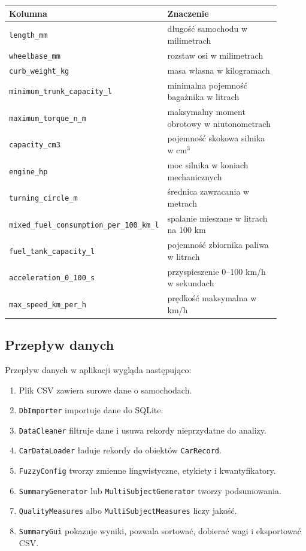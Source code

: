 \documentclass[11pt,a4paper]{article}
\newcommand{\code}[1]{\texttt{#1}}
\newcommand{\smallcode}[1]{{\scriptsize\texttt{#1}}}
\begin{document}
\begin{longtable}{p{0.35\linewidth}p{0.55\linewidth}}
\toprule
\textbf{Kolumna} & \textbf{Znaczenie}\\
\midrule
\endhead
\code{length\_mm} & długość samochodu w milimetrach\\
\code{wheelbase\_mm} & rozstaw osi w milimetrach\\
\code{curb\_weight\_kg} & masa własna w kilogramach\\
\code{minimum\_trunk\_capacity\_l} & minimalna pojemność bagażnika w litrach\\
\code{maximum\_torque\_n\_m} & maksymalny moment obrotowy w niutonometrach\\
\code{capacity\_cm3} & pojemność skokowa silnika w cm\(^3\)\\
\code{engine\_hp} & moc silnika w koniach mechanicznych\\
\code{turning\_circle\_m} & średnica zawracania w metrach\\
\smallcode{mixed\_fuel\_consumption\_per\_100\_km\_l} & spalanie mieszane w litrach na 100 km\\
\code{fuel\_tank\_capacity\_l} & pojemność zbiornika paliwa w litrach\\
\code{acceleration\_0\_100\_s} & przyspieszenie 0--100 km/h w sekundach\\
\code{max\_speed\_km\_per\_h} & prędkość maksymalna w km/h\\
\bottomrule
\end{longtable}

\subsection{Przepływ danych}

Przepływ danych w aplikacji wygląda następująco:

\begin{enumerate}
    \item Plik CSV zawiera surowe dane o samochodach.
    \item \code{DbImporter} importuje dane do SQLite.
    \item \code{DataCleaner} filtruje dane i usuwa rekordy nieprzydatne do analizy.
    \item \code{CarDataLoader} ładuje rekordy do obiektów \code{CarRecord}.
    \item \code{FuzzyConfig} tworzy zmienne lingwistyczne, etykiety i kwantyfikatory.
    \item \code{SummaryGenerator} lub \code{MultiSubjectGenerator} tworzy podsumowania.
    \item \code{QualityMeasures} albo \code{MultiSubjectMeasures} liczy jakość.
    \item \code{SummaryGui} pokazuje wyniki, pozwala sortować, dobierać wagi i eksportować CSV.
\end{enumerate}
\end{document}
